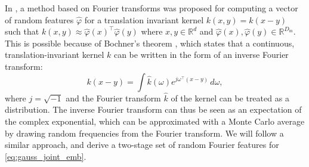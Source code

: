 \documentclass[english]{article}
\theoremstyle{plain}
\theoremstyle{plain}
\newcommand{\factor}{f}				%
\newcommand{\outV}{V}                         %
\newcommand{\approxMsg}[3]{M_{#1 \rightarrow #2}^{#3}}			%
\begin{document}


In \cite{Rahimi2007}, a method based on Fourier transforms was proposed for computing a vector
of random features $\hat{\varphi}$ for a translation invariant kernel $k(x,y) = k(x-y)$
 such that $k(x, y) \approx \hat{\varphi}(x)^\top \hat{\varphi}(y)$
where $x,y \in \mathbb{R}^d$ and $\hat{\varphi}(x), \hat{\varphi}(y) \in \mathbb{R}^{D_\mathrm{in}}$.  
This is possible because of Bochner's theorem \citep{Rudin2013}, which states that a
continuous, translation-invariant kernel $k$ can be written in the form of an
inverse Fourier transform:
\begin{equation*}
k(x-y)=\int\hat{k}(\omega)e^{j\omega^{\top}\left(x-y\right)}\,
d\omega,
\end{equation*}
%
where $j=\sqrt{-1}$ and the Fourier transform $\hat{k}$ of the kernel can be
treated as a distribution. The inverse Fourier transform can thus be seen as
an expectation of the complex exponential, which can be approximated with a
Monte Carlo average by drawing random frequencies from the Fourier transform. 
We will follow a similar approach, and derive 
a two-stage set of random Fourier features for \eqref{eq:gauss_joint_emb}.
\end{document}
